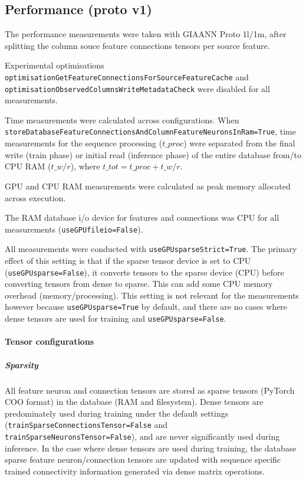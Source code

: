 \FloatBarrier

\subsection{Performance (proto v1)}

The performance measurements were taken with GIAANN Proto 1l/1m, after splitting the column souce feature connections tensors per source feature.

Experimental optimisations \texttt{optimisationGetFeatureConnectionsForSourceFeatureCache} and \texttt{optimisationObservedColumnsWriteMetadataCheck} were disabled for all measurements.

Time measurements were calculated across configurations. When \texttt{storeDatabaseFeatureConnectionsAndColumnFeatureNeuronsInRam=True}, time measurements for the sequence processing ($t\_proc$) were separated from the final write (train phase) or initial read (inference phase) of the entire database from/to CPU RAM ($t\_w/r$), where $t\_tot = t\_proc + t\_w/r$. 

GPU and CPU RAM measurements were calculated as peak memory allocated across execution.

The RAM database i/o device for features and connections was CPU for all measurements (\texttt{useGPUfileio=False}).

All measurements were conducted with \texttt{useGPUsparseStrict=True}. The primary effect of this setting is that if the sparse tensor device is set to CPU (\texttt{useGPUsparse=False}), it converts tensors to the sparse device (CPU) before converting tensors from dense to sparse. This can add some CPU memory overhead (memory/processing). This setting is not relevant for the measurements however because \texttt{useGPUsparse=True} by default, and there are no cases where dense tensors are used for training and \texttt{useGPUsparse=False}.

\paragraph{Tensor configurations}

\subparagraph{Sparsity}
All feature neuron and connection tensors are stored as sparse tensors (PyTorch COO format) in the database (RAM and filesystem). Dense tensors are predominately used during training under the default settings (\texttt{trainSparseConnectionsTensor=False} and \texttt{trainSparseNeuronsTensor=False}), and are never significantly used during inference. In the case where dense tensors are used during training, the database sparse feature neuron/connection tensors are updated with sequence specific trained connectivity information generated via dense matrix operations.

